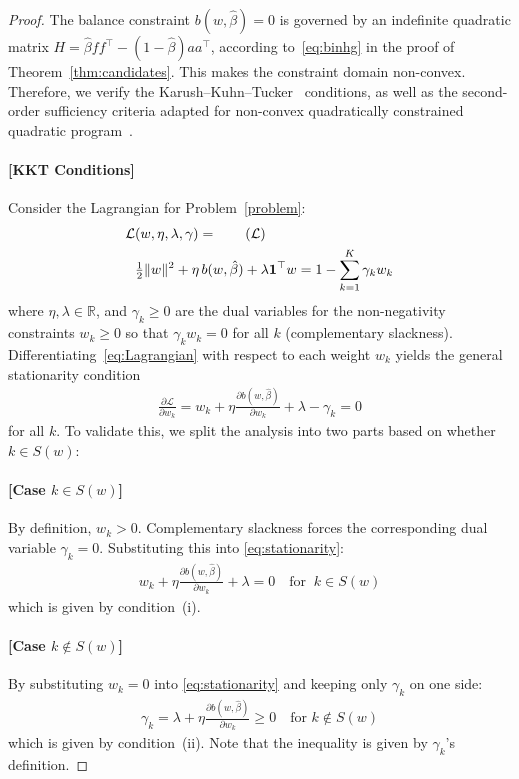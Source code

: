 \documentclass[11pt]{article}
\begin{document}
\begin{proof}
The balance constraint $b(w, \hat\beta) = 0$ is governed by an indefinite quadratic matrix $H = \hat\beta ff^\top - (1-\hat\beta)aa^\top$, according to~\eqref{eq:binhg} in the proof of Theorem~\ref{thm:candidates}. This makes the constraint domain non-convex.
Therefore, we verify the Karush–Kuhn–Tucker~\citep[KKT;][]{WU200746} conditions, as well as the second-order sufficiency criteria adapted for non-convex quadratically constrained quadratic program~\citep[QCQPs;][]{park2017general}. 

\paragraph{[KKT Conditions]}
Consider the Lagrangian for Problem~\eqref{problem}:
\begin{align}
\mathcal L&(w, \eta, \lambda, \gamma) =\tag{$\mathcal L$}\label{eq:Lagrangian}\\&\tfrac12 \Vert{}w\Vert{}^2 + \eta \, b(w, \hat\beta) + \lambda \mathbf 1^\top w=1 - \sum_{k=1}^K \gamma_k w_k\notag
\end{align}
where $\eta,\lambda \in \mathbb R$, and $\gamma_k \ge 0$ are the dual variables for the non-negativity constraints $w_k \ge 0$ so that $\gamma_k w_k=0$ for all $k$ (complementary slackness).
Differentiating~\eqref{eq:Lagrangian} with respect to each weight $w_k$ yields the general stationarity condition
\begin{align}
    \frac{\partial \mathcal L}{\partial w_k} = w_k + \eta \frac{\partial b(w, \hat\beta)}{\partial w_k} + \lambda - \gamma_k = 0\label{eq:stationarity}
\end{align}
for all $k$. To validate this, we split the analysis into two parts based on whether $k \in S(w)$:

\paragraph{[Case $k \in S(w)$]}
By definition, $w_k > 0$. Complementary slackness forces the corresponding dual variable $\gamma_k = 0$. Substituting this into \eqref{eq:stationarity}:
\begin{align}
w_k + \eta \frac{\partial b(w, \hat\beta)}{\partial w_k} + \lambda = 0 \quad \text{for }\ k \in S(w)\label{eq:cond1out}
\end{align}
which is given by condition~(i).

\paragraph{[Case $k \not\in S(w)$]}
By substituting $w_k = 0$ into \eqref{eq:stationarity} and keeping only $\gamma_k$ on one side:
\begin{align}
    \gamma_k =\lambda + \eta \frac{\partial b(w, \hat\beta)}{\partial w_k} \ge 0 \quad \text{for } k \not\in S(w)\label{eq:cond2out}
\end{align}
which is given by condition~(ii). Note that the inequality is given by $\gamma_k$'s definition. 


\end{proof}
\end{document}
